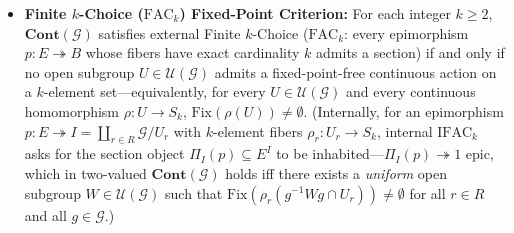 \begin{theorem}
\begin{itemize}
  \item \textbf{Finite $k$-Choice ($\mathrm{FAC}_k$) Fixed-Point Criterion:} For each integer $k \ge 2$, $\mathbf{Cont}(\mathcal{G})$ satisfies external Finite $k$-Choice ($\mathrm{FAC}_k$: every epimorphism $p : E \twoheadrightarrow B$ whose fibers have exact cardinality $k$ admits a section) if and only if no open subgroup $U \in \mathcal{U}(\mathcal{G})$ admits a fixed-point-free continuous action on a $k$-element set---equivalently, for every $U \in \mathcal{U}(\mathcal{G})$ and every continuous homomorphism $\rho : U \to S_k$, $\mathrm{Fix}(\rho(U)) \neq \emptyset$. (Internally, for an epimorphism $p : E \twoheadrightarrow I = \coprod_{r \in R} \mathcal{G}/U_r$ with $k$-element fibers $\rho_r : U_r \to S_k$, internal $\mathrm{IFAC}_k$ asks for the section object $\Pi_I(p) \subseteq E^I$ to be inhabited---$\Pi_I(p) \twoheadrightarrow 1$ epic, which in two-valued $\mathbf{Cont}(\mathcal{G})$ holds iff there exists a \emph{uniform} open subgroup $W \in \mathcal{U}(\mathcal{G})$ such that $\mathrm{Fix}(\rho_r(g^{-1} W g \cap U_r)) \neq \emptyset$ for all $r \in R$ and all $g \in \mathcal{G}$.)

\end{itemize}

\end{theorem}

